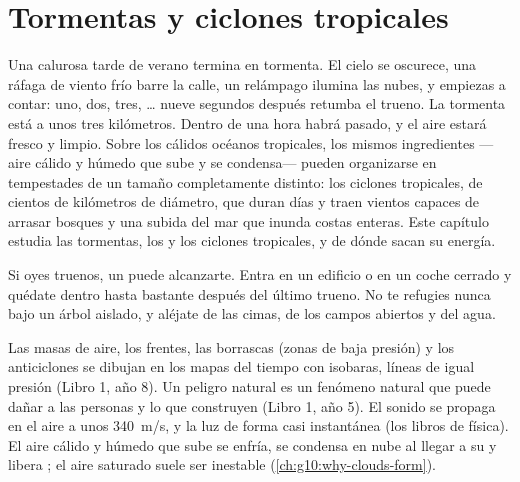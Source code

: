 \chapter{Tormentas y ciclones tropicales}\label{ch:g10:storms-and-cyclones}

Una calurosa tarde de verano termina en tormenta. El cielo se oscurece, una
ráfaga de viento frío barre la calle, un relámpago ilumina las nubes, y
empiezas a contar: uno, dos, tres, \ldots{} nueve segundos después retumba el
trueno. La tormenta está a unos tres kilómetros. Dentro de una hora habrá
pasado, y el aire estará fresco y limpio. Sobre los cálidos océanos
tropicales, los mismos ingredientes ---aire cálido y húmedo que sube y se
condensa--- pueden organizarse en tempestades de un tamaño completamente
distinto: los ciclones tropicales, de cientos de kilómetros de diámetro, que
duran días y traen vientos capaces de arrasar bosques y una subida del mar
que inunda costas enteras. Este capítulo estudia las tormentas, los 
y los ciclones tropicales, y de dónde sacan su energía.

\begin{safety}
Si oyes truenos, un  puede alcanzarte. Entra en un edificio o en un coche
cerrado y quédate dentro hasta bastante después del último trueno. No te
refugies nunca bajo un árbol aislado, y aléjate de las cimas, de los campos
abiertos y del agua.
\end{safety}

\begin{recall}
Las masas de aire, los frentes, las borrascas (zonas de baja presión) y los
anticiclones se dibujan en los mapas del tiempo con isobaras, líneas de
igual presión (Libro 1, año 8). Un peligro natural es un fenómeno natural
que puede dañar a las personas y lo que construyen (Libro 1, año 5). El
sonido se propaga en el aire a unos \qty{340}{m/s}, y la luz de forma casi
instantánea (los libros de física). El aire cálido y húmedo que sube se
enfría, se condensa en nube al llegar a su  y libera
; el aire saturado suele ser inestable
(\cref{ch:g10:why-clouds-form}).
\end{recall}

